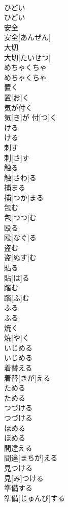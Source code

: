 \documentclass[8pt]{extreport}
\begin{document}
\begin{CJK}{UTF8}{min}
\\	ひどい	
\\	ひどい
\\	安全	
\\	安全[あんぜん]
\\	大切	
\\	大切[たいせつ]
\\	めちゃくちゃ	
\\	めちゃくちゃ
\\	置く	
\\	置[お]く
\\	気が付く	
\\	気[き]が 付[つ]く
\\	ける	
\\	ける
\\	刺す	
\\	刺[さ]す
\\	触る	
\\	触[さわ]る
\\	捕まる	
\\	捕[つか]まる
\\	包む	
\\	包[つつ]む
\\	殴る	
\\	殴[なぐ]る
\\	盗む	
\\	盗[ぬす]む
\\	貼る	
\\	貼[は]る
\\	踏む	
\\	踏[ふ]む
\\	ふる	
\\	ふる
\\	焼く	
\\	焼[や]く
\\	いじめる	
\\	いじめる
\\	着替える	
\\	着替[きが]える
\\	ためる	
\\	ためる
\\	つづける	
\\	つづける
\\	ほめる	
\\	ほめる
\\	間違える	
\\	間違[まちが]える
\\	見つける	
\\	見[み]つける
\\	準備する	
\\	準備[じゅんび]する

\end{CJK}
\end{document}
